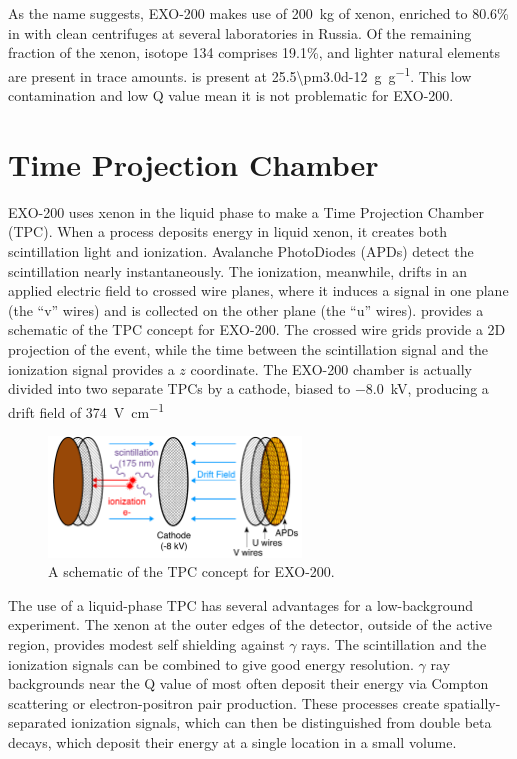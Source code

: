 \documentclass[herrin-thesis.tex]{subfiles}
\begin{document}
As the name suggests, EXO-200 makes use of \SI{200}{\kg} of xenon, enriched to 80.6\% in  with clean centrifuges at several laboratories in Russia. Of the remaining fraction of the xenon, isotope 134 comprises 19.1\%, and lighter natural elements are present in trace amounts.  is present at \SI[per-mode=symbol]{25.5\pm3.0d-12}{\g\per\g}\cite{Dobi:2012nx}. This low contamination and low Q value mean it is not problematic for EXO-200.

\section{Time Projection Chamber}
EXO-200 uses xenon in the liquid phase to make a Time Projection Chamber (TPC). When a process deposits energy in liquid xenon, it creates both scintillation light and ionization. Avalanche PhotoDiodes (APDs) detect the scintillation nearly instantaneously. The ionization, meanwhile, drifts in an applied electric field to crossed wire planes, where it induces a signal in one plane (the ``v'' wires) and is collected on the other plane (the ``u'' wires).  provides a schematic of the TPC concept for EXO-200. The crossed wire grids provide a 2D projection of the event, while the time between the scintillation signal and the ionization signal provides a \(z\) coordinate. The EXO-200 chamber is actually divided into two separate TPCs by a cathode, biased to \SI{-8.0}{\kV}, producing a drift field of \SI{374}{\V\per\cm}

\begin{figure}
\centering
\includegraphics[width=0.6\textwidth]{./figures/tpc_schematic.pdf}
\caption[A schematic of a TPC]{A schematic of the TPC concept for EXO-200.}
\label{fig:detector_tpc_cartoon}
\end{figure}

The use of a liquid-phase TPC has several advantages for a low-background experiment. The xenon at the outer edges of the detector, outside of the active region, provides modest self shielding against \(\gamma\) rays. The scintillation and the ionization signals can be combined to give good energy resolution\cite{Conti:2003tg}\cite{Aprile:2007hc}. \(\gamma\) ray backgrounds near the Q value of  most often deposit their energy via Compton scattering or electron-positron pair production. These processes create spatially-separated ionization signals, which can then be distinguished from double beta decays, which deposit their energy at a single location in a small volume.
\end{document}
